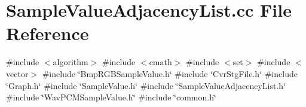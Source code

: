 \section{Sample\+Value\+Adjacency\+List.\+cc File Reference}
\label{SampleValueAdjacencyList_8cc}
{\ttfamily \#include $<$algorithm$>$}\newline
{\ttfamily \#include $<$cmath$>$}\newline
{\ttfamily \#include $<$set$>$}\newline
{\ttfamily \#include $<$vector$>$}\newline
{\ttfamily \#include \char`\"{}Bmp\+R\+G\+B\+Sample\+Value.\+h\char`\"{}}\newline
{\ttfamily \#include \char`\"{}Cvr\+Stg\+File.\+h\char`\"{}}\newline
{\ttfamily \#include \char`\"{}Graph.\+h\char`\"{}}\newline
{\ttfamily \#include \char`\"{}Sample\+Value.\+h\char`\"{}}\newline
{\ttfamily \#include \char`\"{}Sample\+Value\+Adjacency\+List.\+h\char`\"{}}\newline
{\ttfamily \#include \char`\"{}Wav\+P\+C\+M\+Sample\+Value.\+h\char`\"{}}\newline
{\ttfamily \#include \char`\"{}common.\+h\char`\"{}}\newline
